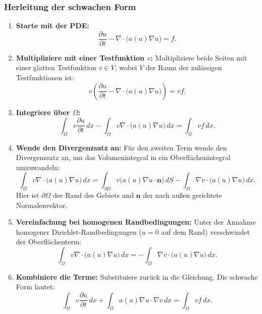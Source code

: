 \subsubsection{Herleitung der schwachen Form}
\begin{enumerate}
	\item \textbf{Starte mit der PDE:}
	\begin{equation}
		\frac{\partial u}{\partial t} - \nabla \cdot \big(a(u) \nabla u\big) = f.
	\end{equation}
	
	\item \textbf{Multipliziere mit einer Testfunktion $v$:} Multipliziere beide Seiten mit einer glatten Testfunktion $v \in V$, wobei $V$ der Raum der zulässigen Testfunktionen ist:
	\begin{equation}
		v \left(\frac{\partial u}{\partial t} - \nabla \cdot \big(a(u) \nabla u\big)\right) = v f.
	\end{equation}
	
	\item \textbf{Integriere über $\Omega$:}
	\begin{equation}
		\int_\Omega v \frac{\partial u}{\partial t} \, dx - \int_\Omega v \nabla \cdot \big(a(u) \nabla u\big) \, dx = \int_\Omega v f \, dx.
	\end{equation}
	
	\item \textbf{Wende den Divergenzsatz an:} Für den zweiten Term wende den Divergenzsatz an, um das Volumenintegral in ein Oberflächenintegral umzuwandeln:
	\begin{equation}
		\int_\Omega v \nabla \cdot \big(a(u) \nabla u\big) \, dx = \int_{\partial \Omega} v \big(a(u) \nabla u \cdot \mathbf{n}\big) \, dS - \int_\Omega \nabla v \cdot \big(a(u) \nabla u\big) \, dx.
	\end{equation}
	Hier ist $\partial \Omega$ der Rand des Gebiets und $\mathbf{n}$ der nach außen gerichtete Normalenvektor.
	
	\item \textbf{Vereinfachung bei homogenen Randbedingungen:} Unter der Annahme homogener Dirichlet-Randbedingungen ($u = 0$ auf dem Rand) verschwindet der Oberflächenterm:
	\begin{equation}
		\int_\Omega v \nabla \cdot \big(a(u) \nabla u\big) \, dx = -\int_\Omega \nabla v \cdot \big(a(u) \nabla u\big) \, dx.
	\end{equation}
	
	\item \textbf{Kombiniere die Terme:} Substituiere zurück in die Gleichung. Die schwache Form lautet:
	\begin{equation}
		\int_\Omega v \frac{\partial u}{\partial t} \, dx + \int_\Omega a(u) \nabla u \cdot \nabla v \, dx = \int_\Omega v f \, dx.
	\end{equation}
\end{enumerate}

